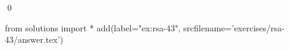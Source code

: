 
\begin{ex} 
  \label{ex:rsa-43}
  
  \qed
\end{ex} 
\begin{python0}
from solutions import *
add(label="ex:rsa-43",
    srcfilename='exercises/rsa-43/answer.tex') 
\end{python0}
